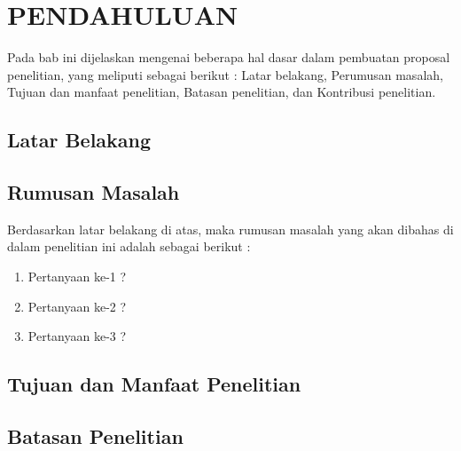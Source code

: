 %
%
%
%
%

\chapter{PENDAHULUAN}

Pada bab ini dijelaskan mengenai beberapa hal dasar dalam pembuatan proposal penelitian, yang meliputi sebagai berikut : Latar belakang, Perumusan masalah, Tujuan dan manfaat penelitian, Batasan penelitian, dan Kontribusi penelitian.

\section{Latar Belakang}

\blindtext

\section{Rumusan Masalah}

Berdasarkan latar belakang di atas, maka rumusan masalah yang akan dibahas di dalam penelitian ini adalah sebagai berikut :

\begin{enumerate}
    \item Pertanyaan ke-1 ?
    \item Pertanyaan ke-2 ?
    \item Pertanyaan ke-3 ?
\end{enumerate}

\section{Tujuan dan Manfaat Penelitian}

\blindtext

\section{Batasan Penelitian}

